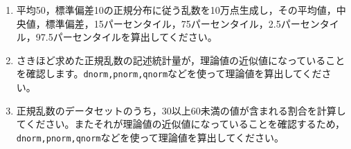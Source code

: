 \begin{enumerate}
	\item 平均50，標準偏差10の正規分布に従う乱数を10万点生成し，その平均値，中央値，標準偏差，15パーセンタイル，75パーセンタイル，2.5パーセンタイル，97.5パーセンタイルを算出してください。
	\item さきほど求めた正規乱数の記述統計量が，理論値の近似値になっていることを確認します。\texttt{dnorm,pnorm,qnorm}などを使って理論値を算出してください。
	\item 正規乱数のデータセットのうち，30以上60未満の値が含まれる割合を計算してください。またそれが理論値の近似値になっていることを確認するため，\texttt{dnorm,pnorm,qnorm}などを使って理論値を算出してください。
\end{enumerate}
